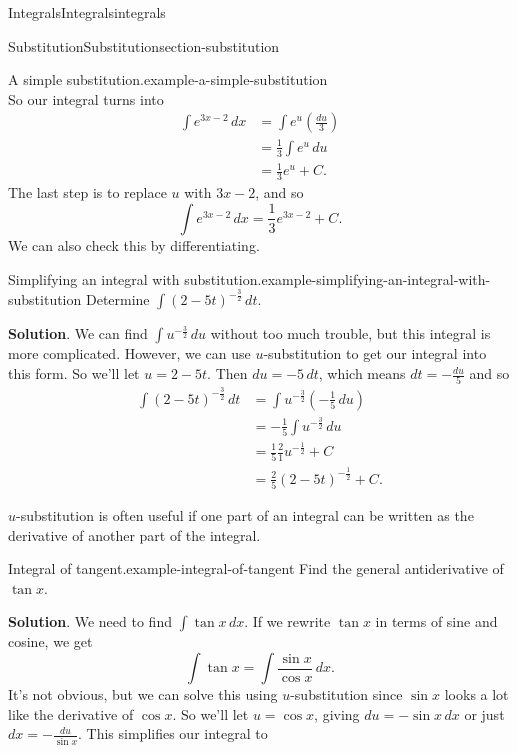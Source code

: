 \documentclass[oneside,10pt,]{book}
\numberwithin{equation}{section}
\begin{document}
\begin{chapterptx}{Integrals}{}{Integrals}{}{}{integrals}
\begin{sectionptx}{Substitution}{}{Substitution}{}{}{section-substitution}
\begin{example}{A simple substitution.}{example-a-simple-substitution}
\begin{equation*}
\end{equation*}
So our integral turns into%
\begin{align*}
\int e^{3x-2}\,dx & = \int e^{u}\left(\frac{du}{3}\right) \\
& = \frac{1}{3}\int e^{u}\,du \\
& = \frac{1}{3}e^{u} + C. 
\end{align*}
The last step is to replace \(u\) with \(3x-2\), and so%
\begin{equation*}
\int e^{3x-2}\,dx = \frac{1}{3}e^{3x-2} + C.
\end{equation*}
We can also check this by differentiating.%
\end{example}
\begin{example}{Simplifying an integral with substitution.}{example-simplifying-an-integral-with-substitution}%
\hypertarget{p-483}{}%
Determine \(\int(2 - 5t)^{-\frac{3}{2}}\,dt\).%
\par\smallskip%
\noindent\textbf{Solution}.\hypertarget{solution-106}{}\quad%
\hypertarget{p-484}{}%
We can find \(\int u^{-\frac{3}{2}}\,du\) without too much trouble, but this integral is more complicated. However, we can use \(u\)-substitution to get our integral into this form. So we'll let \(u = 2 - 5t\). Then \(du = -5\,dt\), which means \(dt = -\frac{du}{5}\) and so%
\begin{align*}
\int(2-5t)^{-\frac{3}{2}}\,dt & = \int u^{-\frac{3}{2}}\left(-\frac{1}{5}\,du\right) \\
& = -\frac{1}{5}\int u^{-\frac{3}{2}}\,du \\
& = \frac{1}{5}\frac{2}{1}u^{-\frac{1}{2}} + C \\
& = \frac{2}{5}(2 - 5t)^{-\frac{1}{2}} + C. 
\end{align*}
%
\end{example}
\hypertarget{p-485}{}%
\(u\)-substitution is often useful if one part of an integral can be written as the derivative of another part of the integral.%
\begin{example}{Integral of tangent.}{example-integral-of-tangent}%
\hypertarget{p-486}{}%
Find the general antiderivative of \(\tan x\).%
\par\smallskip%
\noindent\textbf{Solution}.\hypertarget{solution-107}{}\quad%
\hypertarget{p-487}{}%
We need to find \(\int\tan x\,dx\). If we rewrite \(\tan x\) in terms of sine and cosine, we get%
\begin{equation*}
\int\tan x = \int\frac{\sin x}{\cos x}\,dx.
\end{equation*}
It's not obvious, but we can solve this using \(u\)-substitution since \(\sin x\) looks a lot like the derivative of \(\cos x\). So we'll let \(u = \cos x\), giving \(du = -\sin x\,dx\) or just \(dx = -\frac{du}{\sin x}\). This simplifies our integral to%

\end{example}
\end{sectionptx}
\end{chapterptx}
\end{document}
